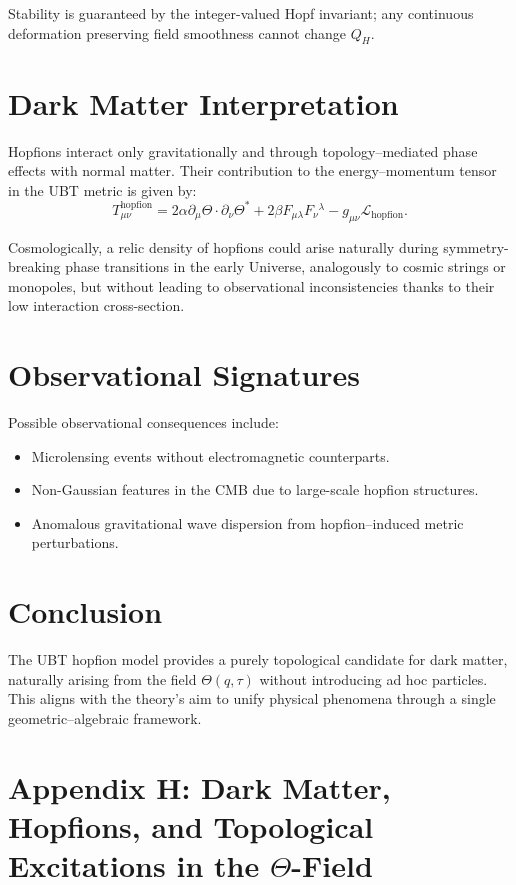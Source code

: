 \documentclass[12pt,a4paper]{article}
\numberwithin{equation}{section}
\theoremstyle{definition}
\theoremstyle{remark}
\begin{document}
Stability is guaranteed by the integer-valued Hopf invariant; any continuous deformation preserving field smoothness cannot change \(Q_H\).

\section*{Dark Matter Interpretation}
Hopfions interact only gravitationally and through topology–mediated phase effects with normal matter. Their contribution to the energy–momentum tensor in the UBT metric is given by:
\begin{equation}
T_{\mu\nu}^{\text{hopfion}} = 2\alpha \partial_\mu \Theta \cdot \partial_\nu \Theta^* + 2\beta F_{\mu\lambda} F_{\nu}{}^\lambda - g_{\mu\nu} \mathcal{L}_{\text{hopfion}}.
\end{equation}

Cosmologically, a relic density of hopfions could arise naturally during symmetry-breaking phase transitions in the early Universe, analogously to cosmic strings or monopoles, but without leading to observational inconsistencies thanks to their low interaction cross-section.

\section*{Observational Signatures}
Possible observational consequences include:
\begin{itemize}
\item Microlensing events without electromagnetic counterparts.
\item Non-Gaussian features in the CMB due to large-scale hopfion structures.
\item Anomalous gravitational wave dispersion from hopfion–induced metric perturbations.
\end{itemize}

\section*{Conclusion}
The UBT hopfion model provides a purely topological candidate for dark matter, naturally arising from the field \(\Theta(q,\tau)\) without introducing ad hoc particles. This aligns with the theory’s aim to unify physical phenomena through a single geometric–algebraic framework.

\section*{Appendix H: Dark Matter, Hopfions, and Topological Excitations in the $\Theta$-Field}
\end{document}
